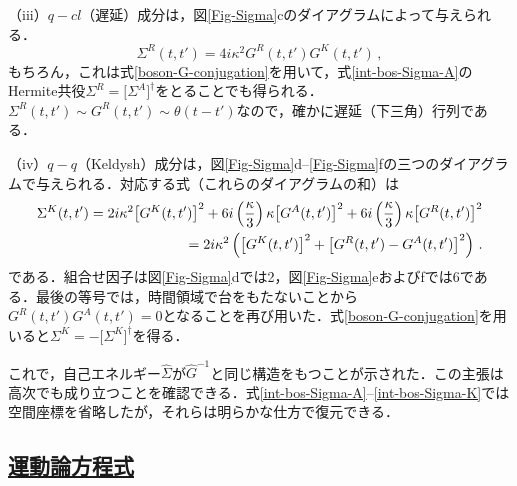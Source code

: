 \documentclass[a4paper,11pt]{ltjsarticle}
\newcommand{\subsectionlink}[1]{\subsection[#1]{\hyperlink{toc}{#1}}}
\begin{document}
（iii）\textit{$q-cl$}（遅延）成分は，図\ref{Fig-Sigma}cのダイアグラムによって与えられる．
\begin{equation}\label{int-bos-Sigma-R}
\Sigma^R(t,t') = 4i\kappa^2 G^R(t,t')G^K(t,t')\,,
\end{equation}もちろん，これは式\eqref{boson-G-conjugation}を用いて，式\eqref{int-bos-Sigma-A}のHermite共役$\Sigma^R=\big[\Sigma^A\big]^\dagger$をとることでも得られる．$\Sigma^R(t,t')\sim
G^R(t,t')\sim\theta(t-t')$なので，確かに遅延（下三角）行列である．


（iv）\textit{$q-q$}（Keldysh）成分は，図\ref{Fig-Sigma}d--\ref{Fig-Sigma}fの三つのダイアグラムで与えられる．対応する式（これらのダイアグラムの和）は
\begin{eqnarray}\label{int-bos-Sigma-K}
\Sigma^K(t,t') = 2i\kappa^2 \big[G^K(t,t')\big]^2 +
6i\left({\kappa\over 3}\right)\kappa \big[G^A(t,t')\big]^2
+ 6i\left({\kappa\over 3}\right)\kappa \big[G^R(t,t')\big]^2\nonumber
\\
= 2i\kappa^2\left(\big[G^K(t,t')\big]^2+\big[G^R(t,t') -
G^A(t,t')\big]^2\right)\,.
\end{eqnarray}である．組合せ因子は図\ref{Fig-Sigma}dでは2，図\ref{Fig-Sigma}eおよびfでは6である．最後の等号では，時間領域で台をもたないことから$G^R(t,t')G^A(t,t')=0$となることを再び用いた．式\eqref{boson-G-conjugation}を用いると$\Sigma^K=-\big[\Sigma^K\big]^\dagger$を得る．


これで，自己エネルギー$\hat{\Sigma}$が$\hat{G}^{-1}$と同じ構造をもつことが示された．この主張は高次でも成り立つことを確認できる．式\eqref{int-bos-Sigma-A}--\eqref{int-bos-Sigma-K}では空間座標を省略したが，それらは明らかな仕方で復元できる．


\subsectionlink{運動論方程式}\label{sec_int_bos-5}
\end{document}
